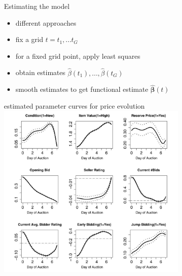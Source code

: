 \documentclass[hyperref={pdfpagelabels=false}]{beamer}
\begin{document}
\begin{frame}{Estimating the model}
\begin{itemize}
\item different approaches
\item fix a grid $t=t_1,...t_G$
\item for a fixed grid point, apply least squares
\item obtain estimates $\hat{\beta}(t_1),...,\hat{\beta}(t_G)$ 
\item smooth estimates to get functional estimate $\mathbf{\hat{\pmb{\beta}}}(t)$ 
\end{itemize}
\end{frame}

\begin{frame}{estimated parameter curves for price evolution} %
\center
\includegraphics[width=0.7\textwidth]{price_evolution}
\end{frame}
\end{document}
